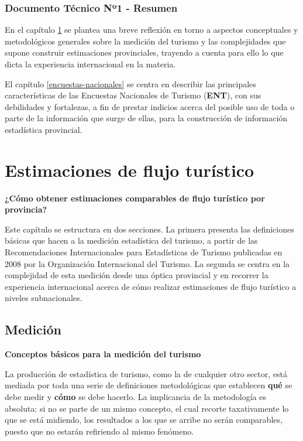 \documentclass[
  openany]{book}
\begin{document}
\hypertarget{documento-tuxe9cnico-nuxba1---resumen}{%
\subsection*{Documento Técnico Nº1 - Resumen}\label{documento-tuxe9cnico-nuxba1---resumen}}

En el capítulo \ref{flujo-turistico} se plantea una breve reflexión en torno a aspectos conceptuales y metodológicos generales sobre la medición del turismo y las complejidades que supone construir estimaciones provinciales, trayendo a cuenta para ello lo que dicta la experiencia internacional en la materia.

El capítulo \ref{encuestas-nacionales} se centra en describir las principales características de las Encuestas Nacionales de Turismo (\textbf{ENT}), con sus debilidades y fortalezas, a fin de prestar indicios acerca del posible uso de toda o parte de la información que surge de ellas, para la construcción de información estadística provincial.

\hypertarget{flujo-turistico}{%
\chapter{\texorpdfstring{\textbf{Estimaciones de flujo turístico}}{Estimaciones de flujo turístico}}\label{flujo-turistico}}

\textbf{¿Cómo obtener estimaciones comparables de flujo turístico por provincia?}

Este capítulo se estructura en dos secciones. La primera presenta las definiciones básicas que hacen a la medición estadística del turismo, a partir de las Recomendaciones Internacionales para Estadísticas de Turismo publicadas en 2008 por la Organización Internacional del Turismo. La segunda se centra en la complejidad de esta medición desde una óptica provincial y en recorrer la experiencia internacional acerca de cómo realizar estimaciones de flujo turístico a niveles subnacionales.

\hypertarget{mediciuxf3n}{%
\section{Medición}\label{mediciuxf3n}}

\textbf{Conceptos básicos para la medición del turismo}

La producción de estadística de turismo, como la de cualquier otro sector, está mediada por toda una serie de definiciones metodológicas que establecen \textbf{qué} se debe medir y \textbf{cómo} se debe hacerlo. La implicancia de la metodología es absoluta: si no se parte de un mismo concepto, el cual recorte taxativamente lo que se está midiendo, los resultados a los que se arribe no serán comparables, puesto que no estarán refiriendo al mismo fenómeno.
\end{document}
